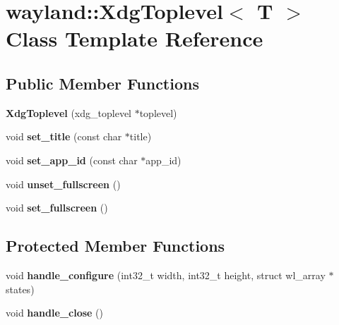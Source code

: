 \hypertarget{classwayland_1_1XdgToplevel}{}\section{wayland\+::Xdg\+Toplevel$<$ T $>$ Class Template Reference}
\label{classwayland_1_1XdgToplevel}
\subsection*{Public Member Functions}
\begin{DoxyCompactItemize}
\item 
\mbox{\label{classwayland_1_1XdgToplevel_a7a13e882a79e0bda122e754d758d6022}} 
{\bfseries Xdg\+Toplevel} (xdg\+\_\+toplevel $\ast$toplevel)
\item 
\mbox{\label{classwayland_1_1XdgToplevel_a2f18cec00aa163d11950b7e37831885f}} 
void {\bfseries set\+\_\+title} (const char $\ast$title)
\item 
\mbox{\label{classwayland_1_1XdgToplevel_a2e694ae5d5276b39f586510af044c554}} 
void {\bfseries set\+\_\+app\+\_\+id} (const char $\ast$app\+\_\+id)
\item 
\mbox{\label{classwayland_1_1XdgToplevel_a17978249751a32e8b057676e9e4f8911}} 
void {\bfseries unset\+\_\+fullscreen} ()
\item 
\mbox{\label{classwayland_1_1XdgToplevel_a80d32dfa80a3bd0a5ef2ff6d67977529}} 
void {\bfseries set\+\_\+fullscreen} ()
\end{DoxyCompactItemize}
\subsection*{Protected Member Functions}
\begin{DoxyCompactItemize}
\item 
\mbox{\label{classwayland_1_1XdgToplevel_a266eb51ba7b8a4a3b6c92a5be4461fbe}} 
void {\bfseries handle\+\_\+configure} (int32\+\_\+t width, int32\+\_\+t height, struct wl\+\_\+array $\ast$states)
\item 
\mbox{\label{classwayland_1_1XdgToplevel_abe3e930a6359ce94ef0a51a18e75cbc8}} 
void {\bfseries handle\+\_\+close} ()
\end{DoxyCompactItemize}
